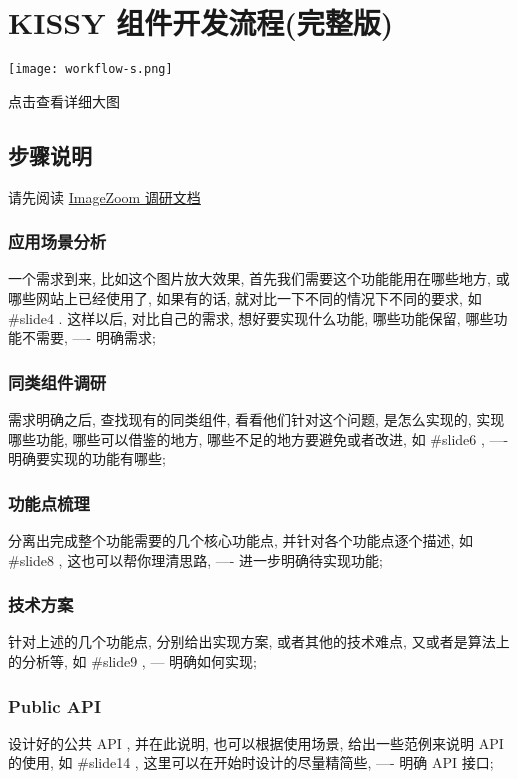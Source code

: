 \documentclass[letterpaper,10pt,english]{sphinxmanual}
\begin{document}
\section{KISSY 组件开发流程(完整版)}
\label{workflow/workflow-full:workflow-full}\label{workflow/workflow-full::doc}\label{workflow/workflow-full:kissy}
\texttt{[image: workflow-s.png]}

点击查看详细大图


\subsection{步骤说明}
\label{workflow/workflow-full:id2}
请先阅读 \href{http://kissyteam.github.com/kissy/src/imagezoom/slide.html}{ImageZoom 调研文档}


\subsubsection{应用场景分析}
\label{workflow/workflow-full:id3}
一个需求到来, 比如这个图片放大效果, 首先我们需要这个功能能用在哪些地方, 或哪些网站上已经使用了, 如果有的话, 就对比一下不同的情况下不同的要求, 如 \#slide4 . 这样以后, 对比自己的需求, 想好要实现什么功能, 哪些功能保留, 哪些功能不需要, ---- 明确需求;


\subsubsection{同类组件调研}
\label{workflow/workflow-full:id4}
需求明确之后, 查找现有的同类组件, 看看他们针对这个问题, 是怎么实现的, 实现哪些功能, 哪些可以借鉴的地方, 哪些不足的地方要避免或者改进, 如 \#slide6 , ---- 明确要实现的功能有哪些;


\subsubsection{功能点梳理}
\label{workflow/workflow-full:id5}
分离出完成整个功能需要的几个核心功能点, 并针对各个功能点逐个描述, 如 \#slide8 , 这也可以帮你理清思路,  ---- 进一步明确待实现功能;


\subsubsection{技术方案}
\label{workflow/workflow-full:id6}
针对上述的几个功能点, 分别给出实现方案, 或者其他的技术难点, 又或者是算法上的分析等, 如 \#slide9 , --- 明确如何实现;


\subsubsection{Public API}
\label{workflow/workflow-full:public-api}
设计好的公共 API , 并在此说明, 也可以根据使用场景, 给出一些范例来说明 API 的使用, 如 \#slide14 , 这里可以在开始时设计的尽量精简些, ---- 明确 API 接口;
\end{document}
